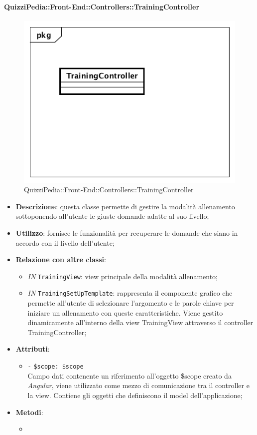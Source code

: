 \paragraph{QuizziPedia::Front-End::Controllers::TrainingController}
\begin{figure} [ht]
	\centering
	\includegraphics[scale=0.45]{UML/Classi/Front-End/QuizziPedia_Front-end_Controller_TrainingController.png}
	\caption{QuizziPedia::Front-End::Controllers::TrainingController}
\end{figure} \FloatBarrier
\begin{itemize}
	\item \textbf{Descrizione}: questa classe permette di gestire la modalità allenamento sottoponendo all'utente le giuste domande adatte al suo livello;
	\item \textbf{Utilizzo}: fornisce le funzionalità per recuperare le domande che siano in accordo con il livello dell'utente;
	\item \textbf{Relazione con altre classi}:
	\begin{itemize}
		\item \textit{IN} \texttt{TrainingView}: view principale della modalità allenamento;
		\item \textit{IN} \texttt{TrainingSetUpTemplate}: rappresenta il componente grafico che permette all'utente di selezionare l'argomento e le parole chiave per iniziare un allenamento con queste caratteristiche. Viene gestito dinamicamente all'interno della view TrainingView attraverso il controller TrainingController;
	\end{itemize}
	\item \textbf{Attributi}:
	\begin{itemize}
		\item \texttt{-} \texttt{\$scope: \$scope} \\
		Campo dati contenente un riferimento all’oggetto \$scope creato da \textit{Angular}, viene utilizzato come mezzo di comunicazione tra il controller e la view. Contiene gli oggetti che definiscono il model dell’applicazione;
	\end{itemize}
	\item \textbf{Metodi}:
	\begin{itemize}
		\item 
	\end{itemize}
\end{itemize}

